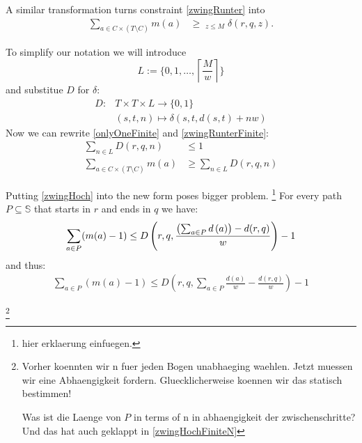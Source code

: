 \documentclass[a4paper]{amsart} %
\newcommand{\todo}[1]{\footnote{#1}}
\begin{document}
A similar transformation turns constraint \ref{zwingRunter} into
\begin{align}
  \label{zwingRunterFinite}
  \sum_{a \in C \times (T \setminus C)} m(a) & \geq \mathop{\sum_{z \in \left\{d (s,t)\right\} \oplus w \mathbb{N}_0}}_{z\leq M} \delta (r,q, z) \textrm{.}
\end{align}

To simplify our notation we will introduce
\begin{equation}
\label{defL}
L := \{0, 1, \dots,\left\lceil \frac{M}{w} \right\rceil \}
\end{equation}
and substitue \(D\) for \(\delta\):
\begin{align}
  D \colon & T \times T \times L  \to \{0,1\} \\
          & (s,       t,        n)                              \mapsto \delta (s,t, d(s,t) + n w)
\end{align}
Now we can rewrite \ref{onlyOneFinite} and \ref{zwingRunterFinite}:
\begin{align}
  \label{onlyOneFiniteN}
  \sum_{n \in L} D (r, q, n) & \leq 1 \\
  \label{zwingRunterFiniteN}
  \sum_{a \in C \times (T \setminus C)} m(a) & \geq \sum_{n \in L} D (r,q, n)
\end{align}

Putting \ref{zwingHoch} into the new form poses bigger
problem. \todo{hier erklaerung einfuegen.}  For every path \(P
\subseteq \mathbb{S}\) that starts in \(r\) and ends in \(q\) we have:
\[
\sum_{a \in P} (m(a) - 1) \leq D \left(r,q, \frac{\left(\sum_{a \in P} d \left(a\right)\right) -d(r,q)}{w}\right) - 1  \\
\]
and thus:
\begin{align}
\label{zwingHochFiniteN}
\sum_{a \in P} (m(a) - 1) \leq D \left(r,q, \sum_{a \in P} \frac{ d \left(a\right)}{w} - \frac{d(r,q)}{w}\right) - 1
\end{align}

\todo{Vorher koennten wir n fuer jeden Bogen unabhaeging waehlen.  Jetzt
  muessen wir eine Abhaengigkeit fordern.  Gluecklicherweise koennen wir das statisch
  bestimmen!

  Was ist die Laenge von \(P\) in terms of n in abhaengigkeit der
  zwischenschritte?  Und das hat auch geklappt in \ref{zwingHochFiniteN}}
\end{document}
